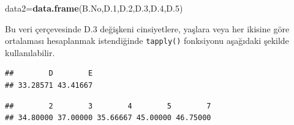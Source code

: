 \documentclass[
]{book}
\newenvironment{Shaded}{\begin{snugshade}}{\end{snugshade}}
\newcommand{\CommentTok}[1]{\textcolor[rgb]{0.56,0.35,0.01}{\textit{#1}}}
\newcommand{\FloatTok}[1]{\textcolor[rgb]{0.00,0.00,0.81}{#1}}
\newcommand{\FunctionTok}[1]{\textcolor[rgb]{0.13,0.29,0.53}{\textbf{#1}}}
\newcommand{\NormalTok}[1]{#1}
\newcommand{\OtherTok}[1]{\textcolor[rgb]{0.56,0.35,0.01}{#1}}
\newcommand{\SpecialCharTok}[1]{\textcolor[rgb]{0.81,0.36,0.00}{\textbf{#1}}}
\begin{document}
\begin{Shaded}
\begin{Highlighting}[]
\NormalTok{data2}\OtherTok{=}\FunctionTok{data.frame}\NormalTok{(B.No,D}\FloatTok{.1}\NormalTok{,D}\FloatTok{.2}\NormalTok{,D}\FloatTok{.3}\NormalTok{,D}\FloatTok{.4}\NormalTok{,D}\FloatTok{.5}\NormalTok{)}
\end{Highlighting}
\end{Shaded}

Bu veri çerçevesinde D.3 değişkeni cinsiyetlere, yaşlara veya her ikisine göre ortalaması hesaplanmak istendiğinde \texttt{tapply()} fonksiyonu aşağıdaki şekilde kullanılabilir.

\begin{Shaded}
\end{Shaded}

\begin{verbatim}
##        D        E 
## 33.28571 43.41667
\end{verbatim}

\begin{Shaded}
\end{Shaded}

\begin{verbatim}
##        2        3        4        5        7 
## 34.80000 37.00000 35.66667 45.00000 46.75000
\end{verbatim}

\begin{Shaded}
\end{Shaded}
\end{document}
